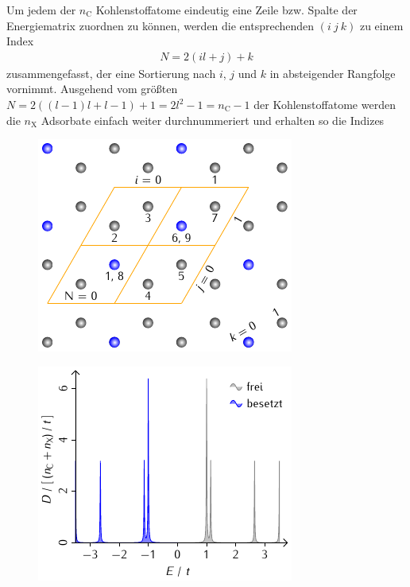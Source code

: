 \documentclass[a4paper, 10pt, twoside, openany]{book} %
\def \nC {n_\mathrm{C}}
\def \nX {n_\mathrm{X}}
\begin{document}
Um jedem der $\nC$ Kohlenstoffatome eindeutig eine Zeile bzw. Spalte der Energiematrix zuordnen zu können, werden die entsprechenden $(i \ j \ k)$ zu einem Index
%
\begin{align*}
    N = 2 (i l + j) + k
\end{align*}
%
zusammengefasst, der eine Sortierung nach $i$, $j$ und $k$ in absteigender Rangfolge vornimmt. Ausgehend vom größten $N = 2 ((l - 1) l + l - 1) + 1 = 2 l^2 - 1 = \nC - 1$ der Kohlenstoffatome werden die $\nX$ Adsorbate einfach weiter durchnummeriert und erhalten so die Indizes
%
\begin{figure}
    \begin{minipage}[b]{0.48\textwidth}
        \includegraphics[width=\textwidth]{Abbildungen/Raumstrukturen/Ortsraumbeispiel.pdf}
        \label{Ortsraumbeispiel}
    \end{minipage}
    \hfill
    \begin{minipage}[b]{0.48\textwidth}
        \includegraphics[width=\textwidth]{Abbildungen/Zustandsdichten/Ortsraumbeispiel.pdf}

\end{minipage}
\end{figure}
\end{document}
